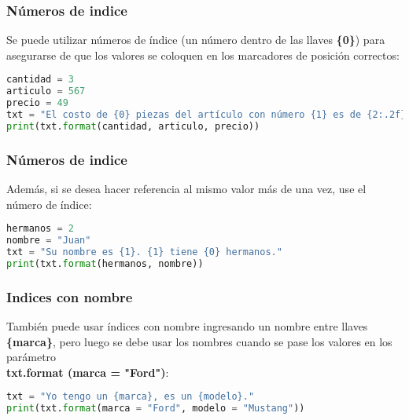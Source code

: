 \begin{frame}[fragile]
  \frametitle{Números de indice}

  Se puede utilizar números de índice (un número dentro de las llaves
  \textbf{\{0\}}) para asegurarse de que los valores se coloquen en
  los marcadores de posición correctos: 

  \vspace{\baselineskip}
  \begin{lstlisting}[language=Python]
cantidad = 3
articulo = 567
precio = 49
txt = "El costo de {0} piezas del artículo con número {1} es de {2:.2f} pesos"
print(txt.format(cantidad, articulo, precio))
  \end{lstlisting}
\end{frame}

\begin{frame}[fragile]
  \frametitle{Números de indice}

  Además, si se desea hacer referencia al mismo valor más de una vez,
  use el número de índice:

  \vspace{\baselineskip}
  \begin{lstlisting}[language=Python]
hermanos = 2
nombre = "Juan"
txt = "Su nombre es {1}. {1} tiene {0} hermanos."
print(txt.format(hermanos, nombre))
  \end{lstlisting}
\end{frame}

\begin{frame}[fragile]
  \frametitle{Indices con nombre}

  También puede usar índices con nombre ingresando un nombre entre
  llaves \textbf{\{marca\}}, pero luego se debe usar los nombres cuando
  se pase los valores en los parámetro \\
  \textbf{txt.format (marca = "Ford")}:

  \vspace{\baselineskip}
  \begin{lstlisting}[language=Python]
txt = "Yo tengo un {marca}, es un {modelo}."
print(txt.format(marca = "Ford", modelo = "Mustang"))
  \end{lstlisting}
\end{frame}
